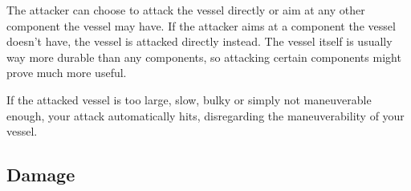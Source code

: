 The attacker can choose to attack the vessel directly or aim at any other component the vessel may have. If the attacker aims at a component the vessel doesn't have, the vessel is attacked directly instead. The vessel itself is usually way more durable than any components, so attacking certain components might prove much more useful.

If the attacked vessel is too large, slow, bulky or simply not maneuverable enough, your attack automatically hits, disregarding the maneuverability of your vessel.

\subsection{Damage}
\label{sub:Damage}
